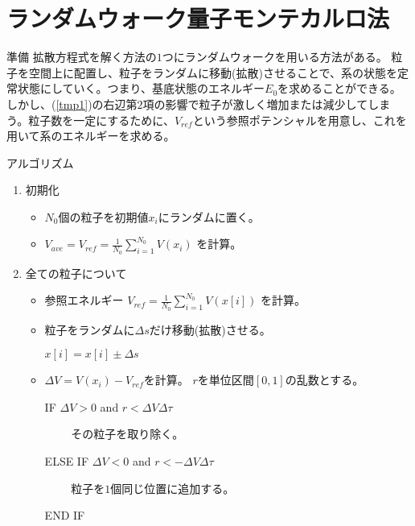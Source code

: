 \documentclass[dvipdfmx]{beamer}
\begin{document}
    \section{ランダムウォーク量子モンテカルロ法}
    \begin{frame}{準備}
        拡散方程式を解く方法の$1$つにランダムウォークを用いる方法がある。
        粒子を空間上に配置し、粒子をランダムに移動(拡散)させることで、系の状態を定常状態にしていく。つまり、基底状態のエネルギー$E_0$を求めることができる。
        \vfill
        しかし、(\ref{tmp1})の右辺第$2$項の影響で粒子が激しく増加または減少してしまう。粒子数を一定にするために、$V_{ref}$という参照ポテンシャルを用意し、これを用いて系のエネルギーを求める。
    \end{frame}

    \begin{frame}{アルゴリズム}
        \begin{enumerate}
            \item 初期化
            \begin{itemize}
                \item $N_0$個の粒子を初期値$x_i$にランダムに置く。
                \item $V_{ave} = V_{ref} = \frac{1}{N_0} \sum_{i=1}^{N_0}V(x_i)$ を計算。
            \end{itemize}
            \item 全ての粒子について
            \begin{itemize}
                \item 参照エネルギー
                $V_{ref} = \frac{1}{N_0}\sum_{i=1}^{N_0}V(x[i])$
                を計算。
                \item 粒子をランダムに$\Delta s$だけ移動(拡散)させる。

                $x[i] = x[i] \pm \Delta s$

                \item $\Delta V = V(x_i) - V_{ref}$を計算。
                $r$を単位区間$[0,1]$の乱数とする。

                IF $\Delta V > 0$ and $r < \Delta V \Delta \tau$

                ~~~~ その粒子を取り除く。

                ELSE IF $\Delta V < 0$ and $r < -\Delta V \Delta \tau$

                ~~~~ 粒子を$1$個同じ位置に追加する。

                END IF
            \end{itemize}

        \end{enumerate}
    \end{frame}
\end{document}
